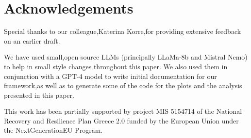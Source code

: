 %
\section*{Acknowledgements}

Special thanks to our colleague,Katerina Korre,for providing extensive feedback on an earlier draft.

We have used small,open source LLMs (principally LLaMa-8b and Mistral Nemo) to help in small style changes throughout this paper. We also used them in conjunction with a GPT-4 model \cite{openai2024gpt4technicalreport} to write initial documentation for our framework,as well as to generate some of the code for the plots and the analysis presented in this paper. 

This work has been partially supported by project MIS 5154714 of the National Recovery and Resilience Plan Greece 2.0 funded by the European Union under the NextGenerationEU Program.